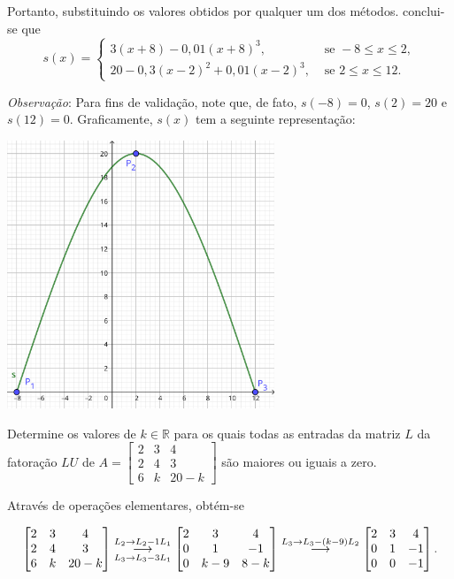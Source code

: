 \documentclass[12pt,a4paper]{article}
\newcommand*\R{\mathbb{R}}
\newcommand{\grstep}[2][\relax]{%
   \ensuremath{\mathrel{
       {\mathop{\longrightarrow}\limits^{#2\mathstrut}_{
                                     \begin{subarray}{l} #1 \end{subarray}}}}}}
\begin{document}
\begin{ExerciseList}
Portanto, substituindo os valores obtidos por qualquer um dos métodos. conclui-se que
\[
  s(x) =
  \begin{cases}
    3 (x + 8) - 0,01(x + 8)^3, & \text{ se } -8 \leq x \leq 2,\\
    20 - 0,3(x - 2)^2 + 0,01(x - 2)^3, & \text{ se } 2 \leq x \leq 12.
  \end{cases}
\]


\textit{Observação}: Para fins de validação, note que, de fato, $s(-8) = 0$, $s(2) = 20$ e $s(12) = 0$. Graficamente, $s(x)$ tem a seguinte representação:

\begin{center}
  \includegraphics[width=8.0cm]{img/prova-2-cci-spline-de-ordem-3-natural.pdf}
\end{center}


\Exercise[title={2,0}] Determine os valores de $k \in \R$ para os quais todas as entradas da matriz $L$ da fatoração $LU$ de $A=\begin{bmatrix}
  2 & 3 & 4 \\
  2 & 4 & 3 \\
  6 & k & 20 -k
\end{bmatrix}$ são maiores ou iguais a zero.

\Answer Através de operações elementares, obtém-se

\[
\begin{bmatrix}
  2 & 3 & 4 \\
  2 & 4 & 3 \\
  6 & k & 20 -k
\end{bmatrix}
\grstep[L_3 \to L_3 -3 L_1]{L_2 \to L_2 - 1 L_1}
\begin{bmatrix}
  2 & 3 & 4 \\
  0 & 1 & -1 \\
  0 & k-9 & 8 -k
\end{bmatrix}
\grstep{L_3 \to L_3 -(k-9)L_2}
\begin{bmatrix}
  2 & 3 & 4 \\
  0 & 1 & -1 \\
  0 & 0 & -1
\end{bmatrix}.
\]


\end{ExerciseList}
\end{document}
